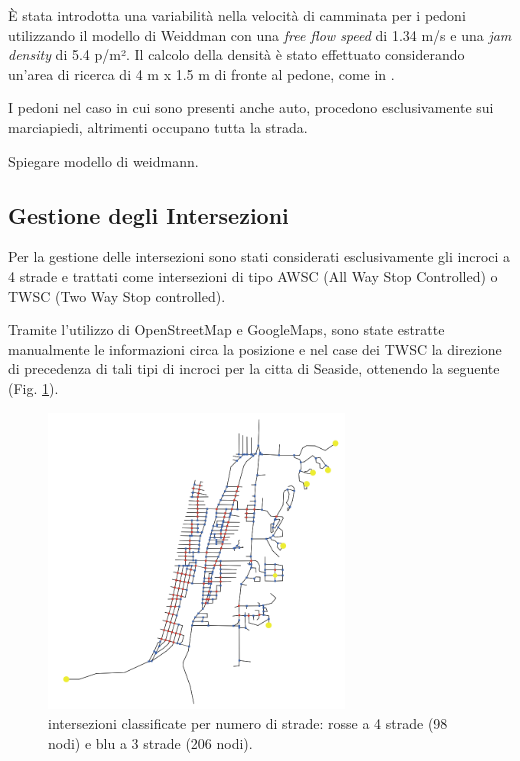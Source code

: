 È stata introdotta una variabilità nella velocità di camminata per i pedoni utilizzando il modello di Weiddman con una \textit{free flow speed} di 1.34 m/s
e una \textit{jam density} di 5.4 p/m².
Il calcolo della densità è stato effettuato considerando un'area di ricerca di 4 m x 1.5 m di fronte al pedone,
come in \textcite{goto2012tsunami, wang2021novel}.

I pedoni nel caso in cui sono presenti anche auto, procedono esclusivamente sui marciapiedi, altrimenti occupano tutta la strada.

Spiegare modello di weidmann.

\newpage

\subsection{Gestione degli Intersezioni}
Per la gestione delle intersezioni sono stati considerati esclusivamente gli incroci a 4 strade e trattati come intersezioni di tipo AWSC (All Way Stop Controlled) o TWSC (Two Way Stop controlled).

Tramite l'utilizzo di OpenStreetMap e GoogleMaps, sono state estratte manualmente le informazioni circa la posizione e nel case dei TWSC la direzione
di precedenza di tali tipi di incroci per la citta di Seaside, ottenendo la seguente (Fig. \ref{fig:intersections}).

\begin{figure}[ht]
    \centering
    \includegraphics[width=0.7\textwidth]{images/intersections}
    \caption{intersezioni classificate per numero di strade: rosse a 4 strade (98 nodi) e blu a 3 strade (206 nodi).}
    \label{fig:intersections}
\end{figure}

